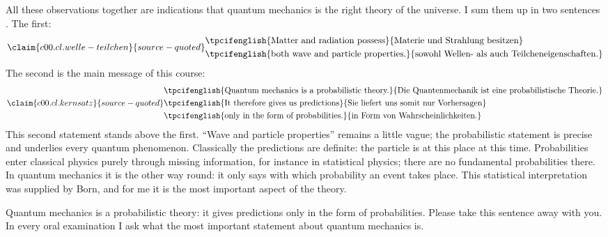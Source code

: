 All these observations together are indications that quantum mechanics is the right theory
of the universe. I sum them up in two sentences
. The first:
\begin{equation}\label{c00.eq.welle-teilchen}\claim{c00.cl.welle-teilchen}{source-quoted}
  \begin{aligned}
    &\text{\tpcifenglish{Matter and radiation possess}{Materie und Strahlung besitzen}} \\
    &\text{\tpcifenglish{both wave and particle properties.}{sowohl Wellen- als auch Teilcheneigenschaften.}}
  \end{aligned}
\end{equation}
The second is the main message of this course:
\begin{equation}\label{c00.eq.kernsatz}\claim{c00.cl.kernsatz}{source-quoted}
  \begin{aligned}
    &\text{\tpcifenglish{Quantum mechanics is a probabilistic theory.}{Die Quantenmechanik ist eine probabilistische Theorie.}} \\
    &\text{\tpcifenglish{It therefore gives us predictions}{Sie liefert uns somit nur Vorhersagen}} \\
    &\text{\tpcifenglish{only in the form of probabilities.}{in Form von Wahrscheinlichkeiten.}}
  \end{aligned}
\end{equation}
This second statement stands above the first. “Wave and particle properties” remains a
little vague; the probabilistic statement is precise and underlies every quantum phenomenon.
Classically the predictions are definite: the particle is at this place at this time.
Probabilities enter classical physics purely through missing information, for instance in
statistical physics; there are no fundamental probabilities there. In quantum mechanics it is
the other way round: it only says with which probability an event takes place. This
statistical interpretation was supplied by Born, and for me it is the most important aspect
of the theory.

\begin{merksatz}
  Quantum mechanics is a probabilistic theory: it gives predictions only in the form of
  probabilities. Please take this sentence away with you. In every oral examination I ask
  what the most important statement about quantum mechanics is.
\end{merksatz}

